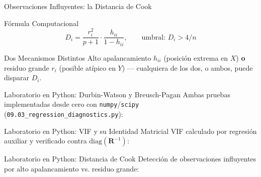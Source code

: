 \documentclass[10pt, aspectratio=169]{beamer}
\begin{document}
\begin{frame}{Observaciones Influyentes: la Distancia de Cook}
  \footnotesize
  \begin{block}{Fórmula Computacional}
    $$D_i=\frac{r_i^2}{p+1}\cdot\frac{h_{ii}}{1-h_{ii}}, \qquad \text{umbral: } D_i>4/n$$
  \end{block}
  \pause

  \vspace{0.1cm}
  \begin{alertblock}{Dos Mecanismos Distintos}
    Alto apalancamiento $h_{ii}$ (posición extrema en $X$) \textbf{o} residuo grande $r_i$ (posible atípico en $Y$) --- cualquiera de los dos, o ambos, puede disparar $D_i$.
  \end{alertblock}
\end{frame}

\begin{frame}[fragile]{Laboratorio en Python: Durbin-Watson y Breusch-Pagan}
  \scriptsize
  Ambas pruebas implementadas desde cero con \texttt{numpy}/\texttt{scipy} (\texttt{09.03\_regression\_diagnostics.py}):
  {
  }
\end{frame}

\begin{frame}[fragile]{Laboratorio en Python: VIF y su Identidad Matricial}
  \scriptsize
  VIF calculado por regresión auxiliar y verificado contra $\text{diag}(\mathbf{R}^{-1})$:
  {
  }
\end{frame}

\begin{frame}[fragile]{Laboratorio en Python: Distancia de Cook}
  \scriptsize
  Detección de observaciones influyentes por alto apalancamiento vs. residuo grande:
  {
  }
\end{frame}
\end{document}
